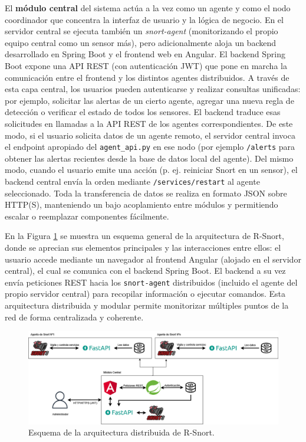\documentclass[11pt,a4paper,twoside]{report}
\begin{document}
El \textbf{módulo central} del sistema actúa a la vez como un agente y como el nodo coordinador que concentra la interfaz de usuario y la lógica de negocio. En el servidor central se ejecuta también un \textit{snort-agent} (monitorizando el propio equipo central como un sensor más), pero adicionalmente aloja un backend desarrollado en Spring Boot y el frontend web en Angular. El backend Spring Boot expone una API REST (con autenticación JWT) que pone en marcha la comunicación entre el frontend y los distintos agentes distribuidos. A través de esta capa central, los usuarios pueden autenticarse y realizar consultas unificadas: por ejemplo, solicitar las alertas de un cierto agente, agregar una nueva regla de detección o verificar el estado de todos los sensores. El backend traduce esas solicitudes en llamadas a la API REST de los agentes correspondientes. De este modo, si el usuario solicita datos de un agente remoto, el servidor central invoca el endpoint apropiado del \texttt{agent\_api.py} en ese nodo (por ejemplo \texttt{/alerts} para obtener las alertas recientes desde la base de datos local del agente). Del mismo modo, cuando el usuario emite una acción (p. ej. reiniciar Snort en un sensor), el backend central envía la orden mediante \texttt{/services/restart} al agente seleccionado. Toda la transferencia de datos se realiza en formato JSON sobre HTTP(S), manteniendo un bajo acoplamiento entre módulos y permitiendo escalar o reemplazar componentes fácilmente.\newline

En la Figura \ref{fig:arquitectura} se muestra un esquema general de la arquitectura de R-Snort, donde se aprecian sus elementos principales y las interacciones entre ellos: el usuario accede mediante un navegador al frontend Angular (alojado en el servidor central), el cual se comunica con el backend Spring Boot. El backend a su vez envía peticiones REST hacia los \texttt{snort-agent} distribuidos (incluido el agente del propio servidor central) para recopilar información o ejecutar comandos. Esta arquitectura distribuida y modular permite monitorizar múltiples puntos de la red de forma centralizada y coherente.

\begin{figure}[h!]
	\includegraphics[width=1.1\textwidth]{documento/6.png}
	\caption{Esquema de la arquitectura distribuida de R-Snort.}
	\label{fig:arquitectura}
\end{figure}
\end{document}
